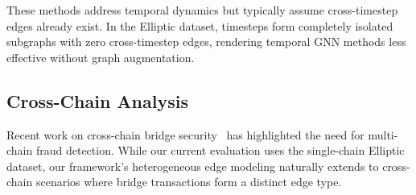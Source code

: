 These methods address temporal dynamics but typically assume cross-timestep edges already exist. In the Elliptic dataset, timesteps form completely isolated subgraphs with zero cross-timestep edges, rendering temporal GNN methods less effective without graph augmentation.

\subsection{Cross-Chain Analysis}

Recent work on cross-chain bridge security~\cite{zhang2023cross} has highlighted the need for multi-chain fraud detection. While our current evaluation uses the single-chain Elliptic dataset, our framework's heterogeneous edge modeling naturally extends to cross-chain scenarios where bridge transactions form a distinct edge type.
